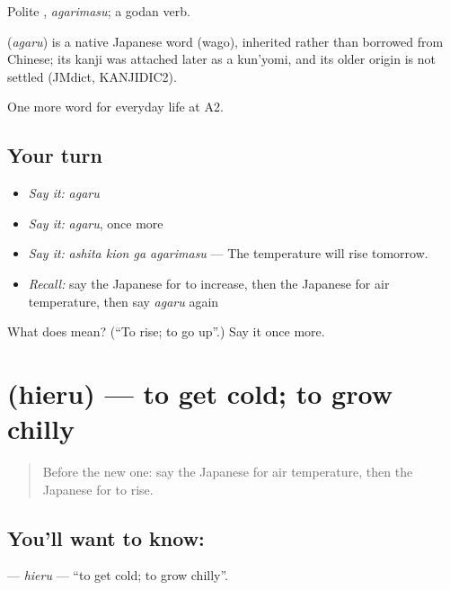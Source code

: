 Polite \textbf{}, \emph{agarimasu}; a godan verb.

\begin{cousinweb}
\textbf{} (\emph{agaru}) is a native Japanese word (wago), inherited rather than borrowed from Chinese; its kanji was attached later as a kun'yomi, and its older origin is not settled (JMdict, KANJIDIC2).
\end{cousinweb}

\begin{grammarlens}[title={What you've built}]
One more word for everyday life at A2.
\end{grammarlens}

\subsection*{Your turn}
\begin{itemize}
\raggedright
  \item \emph{Say it:} \emph{agaru}
  \item \emph{Say it:} \emph{agaru}, once more
  \item \emph{Say it:} \emph{ashita kion ga agarimasu} — The temperature will rise tomorrow.
  \item \emph{Recall:} say the Japanese for to increase, then the Japanese for air temperature, then say \emph{agaru} again
\end{itemize}

\begin{tcolorbox}[breakable,colback=teal!4,colframe=teal!35!black,title={Before you move on}]
What does  mean? (\textquotedblleft{}To rise; to go up\textquotedblright{}.) Say it once more.
\end{tcolorbox}
\section[\texorpdfstring{\ja{ひえる} (hieru)}{ひえる (hieru)}]{ (hieru) — to get cold; to grow chilly}

\label{lesson:JA-C212-hieru}



\begin{quote}
Before the new one: say the Japanese for air temperature, then the Japanese for to rise.
\end{quote}

\subsection*{You'll want to know: }
\textbf{} — \emph{hieru} — \textquotedblleft{}to get cold; to grow chilly\textquotedblright{}.

